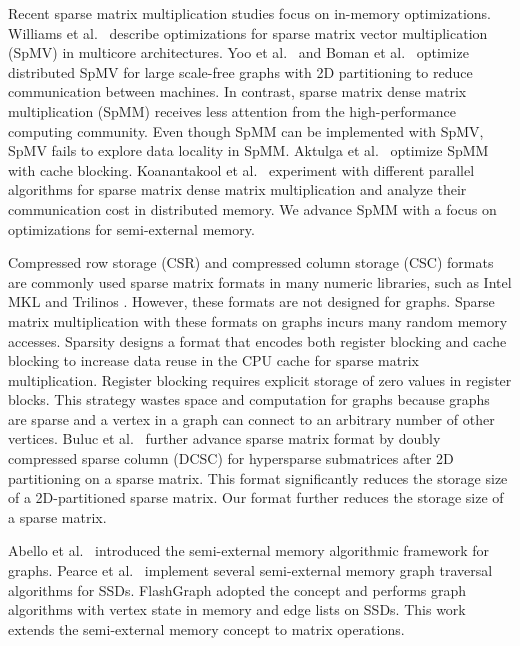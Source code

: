 Recent sparse matrix multiplication studies focus on in-memory optimizations.
Williams et al.~\cite{Williams07} describe optimizations for sparse matrix
vector multiplication (SpMV) in multicore architectures. Yoo et al.~\cite{Yoo11}
and Boman et al.~\cite{Boman2013} optimize distributed SpMV for large
scale-free graphs with 2D partitioning to reduce communication between
machines. In contrast, sparse matrix dense matrix multiplication (SpMM) receives
less attention from the high-performance computing community. Even though
SpMM can be implemented with SpMV, SpMV fails to explore data locality in
SpMM. Aktulga et al.~\cite{Aktulga14} optimize SpMM with cache blocking.
Koanantakool et al.~\cite{Koanantakool16} experiment with different parallel
algorithms for sparse matrix dense matrix multiplication and analyze
their communication cost in distributed memory.
We advance SpMM with a focus on optimizations for semi-external memory.

Compressed row storage (CSR) and compressed column storage (CSC) formats are commonly
used sparse matrix formats in many numeric libraries, such as Intel MKL \cite{mkl}
and Trilinos \cite{trilinos}. However, these formats are not designed for graphs.
Sparse matrix multiplication with these formats on graphs incurs many random memory
accesses. %
Sparsity \cite{Im04} designs a format that encodes both register blocking and cache blocking to
increase data reuse in the CPU cache for sparse matrix multiplication. Register blocking
requires explicit storage of zero values in register blocks. This strategy
wastes space and computation for graphs because graphs are sparse and
a vertex in a graph can connect to an arbitrary number of other vertices. Buluc et al.~\cite{Buluc08}
further advance sparse matrix format
by doubly compressed sparse column (DCSC) for hypersparse submatrices after 2D
partitioning on a sparse matrix. This format significantly reduces the storage
size of a 2D-partitioned sparse matrix. Our format further reduces the storage
size of a sparse matrix.

Abello et al.~\cite{Abello98} introduced the semi-external memory algorithmic
framework for graphs. Pearce et al.~\cite{Pearce10} implement several
semi-external memory graph traversal algorithms for SSDs. FlashGraph
\cite{FlashGraph} adopted the concept and performs graph algorithms with
vertex state in memory and edge lists on SSDs. This work extends the semi-external
memory concept to matrix operations.

